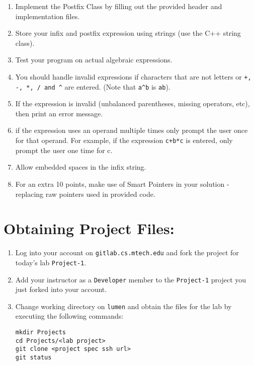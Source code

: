 \documentclass[10pt]{article}
\begin{document}
\begin{enumerate}
   \item Implement the Postfix Class by filling out the provided header and implementation files. 
   
   \item Store your infix and postfix expression using strings (use the C++ string class).

	\item Test your program on actual algebraic expressions.

	\item You should handle invalid expressions if characters that are not letters or \verb|+, -, *, / and ^| are entered. (Note that \verb|a^b| is \verb|ab|).

	\item If the expression is invalid (unbalanced parentheses, missing operators, etc), then print an error message.

	\item if the expression uses an operand multiple times only prompt the user once for that operand.  For example, if the expression \verb|c+b*c| is entered, only prompt the user one time for c. 

	\item Allow embedded spaces in the infix string.

	\item For an extra 10 points, make use of Smart Pointers in your solution - replacing raw pointers used in provided code.
\end{enumerate}

\section*{Obtaining Project Files:}

\begin{enumerate}
	\item Log into your account on \verb|gitlab.cs.mtech.edu| and fork the project for today's lab \verb|Project-1|.
	
	\item Add your instructor as a \verb|Developer| member to the \verb|Project-1| project you just forked into your account.
	
	\item Change  working directory on \verb|lumen| and obtain the files for the lab by executing the following commands: 
   \begin{verbatim}
mkdir Projects      
cd Projects/<lab project>
git clone <project spec ssh url>
git status
   \end{verbatim}
\end{enumerate}
\end{document}
